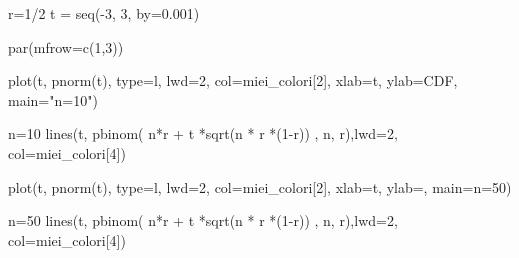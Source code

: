 \documentclass[
  italian,
  letterpaper,
]{book}
\newenvironment{Shaded}{\begin{snugshade}}{\end{snugshade}}
\newcommand{\AttributeTok}[1]{\textcolor[rgb]{0.40,0.45,0.13}{#1}}
\newcommand{\DecValTok}[1]{\textcolor[rgb]{0.68,0.00,0.00}{#1}}
\newcommand{\FloatTok}[1]{\textcolor[rgb]{0.68,0.00,0.00}{#1}}
\newcommand{\FunctionTok}[1]{\textcolor[rgb]{0.28,0.35,0.67}{#1}}
\newcommand{\NormalTok}[1]{\textcolor[rgb]{0.00,0.23,0.31}{#1}}
\newcommand{\OtherTok}[1]{\textcolor[rgb]{0.00,0.23,0.31}{#1}}
\newcommand{\SpecialCharTok}[1]{\textcolor[rgb]{0.37,0.37,0.37}{#1}}
\newcommand{\StringTok}[1]{\textcolor[rgb]{0.13,0.47,0.30}{#1}}
\theoremstyle{definition}
\theoremstyle{remark}
\begin{document}
\begin{Shaded}
\begin{Highlighting}[]
\NormalTok{r}\OtherTok{=}\DecValTok{1}\SpecialCharTok{/}\DecValTok{2}
\NormalTok{t }\OtherTok{=} \FunctionTok{seq}\NormalTok{(}\SpecialCharTok{{-}}\DecValTok{3}\NormalTok{, }\DecValTok{3}\NormalTok{, }\AttributeTok{by=}\FloatTok{0.001}\NormalTok{)}


\FunctionTok{par}\NormalTok{(}\AttributeTok{mfrow=}\FunctionTok{c}\NormalTok{(}\DecValTok{1}\NormalTok{,}\DecValTok{3}\NormalTok{))}

\FunctionTok{plot}\NormalTok{(t, }\FunctionTok{pnorm}\NormalTok{(t), }\AttributeTok{type=}\StringTok{\textquotesingle{}l\textquotesingle{}}\NormalTok{, }\AttributeTok{lwd=}\DecValTok{2}\NormalTok{, }\AttributeTok{col=}\NormalTok{miei\_colori[}\DecValTok{2}\NormalTok{], }\AttributeTok{xlab=}\StringTok{\textquotesingle{}t\textquotesingle{}}\NormalTok{, }\AttributeTok{ylab=}\StringTok{\textquotesingle{}CDF\textquotesingle{}}\NormalTok{, }\AttributeTok{main=}\StringTok{"n=10"}\NormalTok{)}

\NormalTok{n}\OtherTok{=}\DecValTok{10}
\FunctionTok{lines}\NormalTok{(t, }\FunctionTok{pbinom}\NormalTok{( n}\SpecialCharTok{*}\NormalTok{r }\SpecialCharTok{+}\NormalTok{ t }\SpecialCharTok{*}\FunctionTok{sqrt}\NormalTok{(n }\SpecialCharTok{*}\NormalTok{ r }\SpecialCharTok{*}\NormalTok{(}\DecValTok{1}\SpecialCharTok{{-}}\NormalTok{r)) , n, r),}\AttributeTok{lwd=}\DecValTok{2}\NormalTok{, }\AttributeTok{col=}\NormalTok{miei\_colori[}\DecValTok{4}\NormalTok{])}

\FunctionTok{plot}\NormalTok{(t, }\FunctionTok{pnorm}\NormalTok{(t), }\AttributeTok{type=}\StringTok{\textquotesingle{}l\textquotesingle{}}\NormalTok{, }\AttributeTok{lwd=}\DecValTok{2}\NormalTok{, }\AttributeTok{col=}\NormalTok{miei\_colori[}\DecValTok{2}\NormalTok{], }\AttributeTok{xlab=}\StringTok{\textquotesingle{}t\textquotesingle{}}\NormalTok{, }\AttributeTok{ylab=}\StringTok{\textquotesingle{}\textquotesingle{}}\NormalTok{, }\AttributeTok{main=}\StringTok{\textquotesingle{}n=50\textquotesingle{}}\NormalTok{)}

\NormalTok{n}\OtherTok{=}\DecValTok{50}
\FunctionTok{lines}\NormalTok{(t, }\FunctionTok{pbinom}\NormalTok{( n}\SpecialCharTok{*}\NormalTok{r }\SpecialCharTok{+}\NormalTok{ t }\SpecialCharTok{*}\FunctionTok{sqrt}\NormalTok{(n }\SpecialCharTok{*}\NormalTok{ r }\SpecialCharTok{*}\NormalTok{(}\DecValTok{1}\SpecialCharTok{{-}}\NormalTok{r)) , n, r),}\AttributeTok{lwd=}\DecValTok{2}\NormalTok{, }\AttributeTok{col=}\NormalTok{miei\_colori[}\DecValTok{4}\NormalTok{])}


\end{Highlighting}
\end{Shaded}
\end{document}
